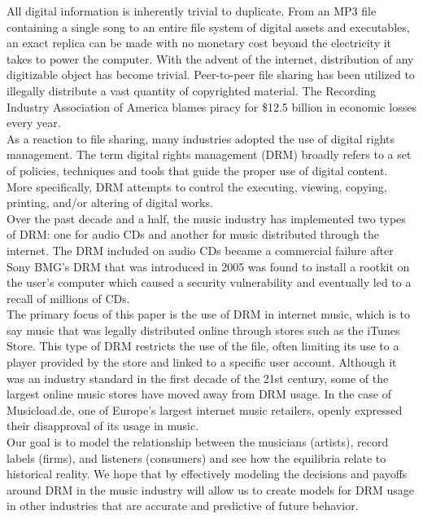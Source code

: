 \documentclass[a4paper,12pt]{article}
\numberwithin{equation}{section}
\begin{document}
All digital information is inherently trivial to duplicate. From an MP3 file containing a single song to an entire file system of digital assets and executables, an exact replica can be made with no monetary cost beyond the electricity it takes to power the computer. With the advent of the internet, distribution of any digitizable object has become trivial. Peer-to-peer file sharing has been utilized to illegally distribute a vast quantity of copyrighted material. The Recording Industry Association of America blames piracy for \$12.5 billion in economic losses every year.\\

As a reaction to file sharing, many industries adopted the use of digital rights management. The term digital rights management (DRM) broadly refers to a set of policies, techniques and tools that guide the proper use of digital content. More specifically, DRM attempts to control the executing, viewing, copying, printing, and/or altering of digital works.\\

Over the past decade and a half, the music industry has implemented two types of DRM: one for audio CDs and another for music distributed through the internet. The DRM included on audio CDs became a commercial failure after Sony BMG’s DRM that was introduced in 2005 was found to install a rootkit on the user’s computer which caused a security vulnerability and eventually led to a recall of millions of CDs.\\

The primary focus of this paper is the use of DRM in internet music, which is to say music that was legally distributed online through stores such as the iTunes Store. This type of DRM restricts the use of the file, often limiting its use to a player provided by the store and linked to a specific user account. Although it was an industry standard in the first decade of the 21st century, some of the largest online music stores have moved away from DRM usage. In the case of Musicload.de, one of Europe's largest internet music retailers, openly expressed their disapproval of its usage in music.\\

Our goal is to model the relationship between the musicians (artists), record labels (firms), and listeners (consumers) and see how the equilibria relate to historical reality. We hope that by effectively modeling the decisions and payoffs around DRM in the music industry will allow us to create models for DRM usage in other industries that are accurate and predictive of future behavior.\\
\end{document}
